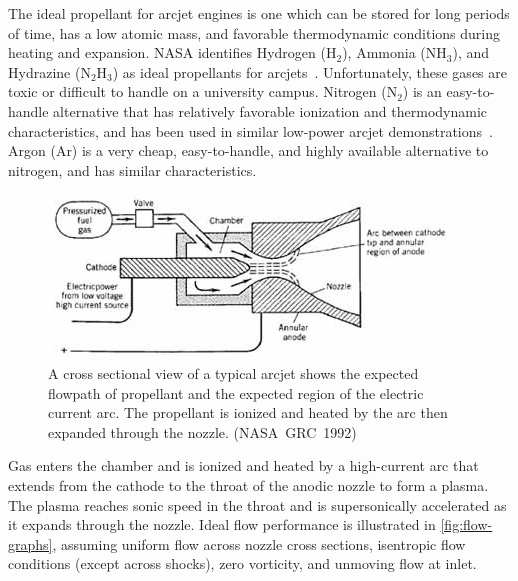 \documentclass[journal]{IEEEtran}
\begin{document}
The ideal propellant for arcjet engines is one which can be stored for long periods of time, has a low atomic mass, and favorable thermodynamic conditions during heating and expansion.
NASA identifies Hydrogen (H$_{2}$), Ammonia (NH$_{3}$), and Hydrazine (N$_{2}$H$_{3}$) as ideal propellants for arcjets~\cite{nasa1992considerations}.
Unfortunately, these gases are toxic or difficult to handle on a university campus.
Nitrogen (N$_{2}$) is an easy-to-handle alternative that has relatively favorable ionization and thermodynamic characteristics, and has been used in similar low-power arcjet demonstrations~\cite{olin2012report,olin2012sim}.
Argon (Ar) is a very cheap, easy-to-handle, and highly available alternative to nitrogen, and has similar characteristics.
\begin{figure}[htp]
  \centering
  \includegraphics[width=\linewidth]{figs/cross-section_nasa}
  \caption[Arcjet cross-section]{A cross sectional view of a typical arcjet shows the expected flowpath of propellant and the expected region of the electric current arc. The propellant is ionized and heated by the arc then expanded through the nozzle. (NASA~GRC~1992)
\label{fig:x-section-nasa}
}
\end{figure}

Gas enters the chamber and is ionized and heated by a high-current arc that extends from the cathode to the throat of the anodic nozzle to form a plasma.
The plasma reaches sonic speed in the throat and is supersonically accelerated as it expands through the nozzle.
Ideal flow performance is illustrated in \autoref{fig:flow-graphs}, assuming
uniform flow across nozzle cross sections, isentropic flow conditions (except across shocks), zero vorticity, and unmoving flow at inlet.
\end{document}
